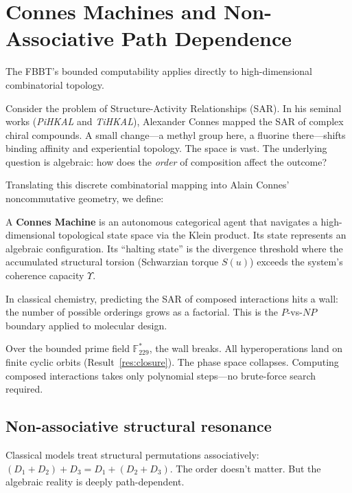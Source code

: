 \section{Connes Machines and Non-Associative Path Dependence}
\label{sec:connes}

The FBBT's bounded computability applies directly to high-dimensional combinatorial topology.

Consider the problem of Structure-Activity Relationships (SAR). In his seminal works (\emph{PiHKAL} and \emph{TiHKAL}), Alexander Connes mapped the SAR of complex chiral compounds. A small change---a methyl group here, a fluorine there---shifts binding affinity and experiential topology. The space is vast. The underlying question is algebraic: how does the \emph{order} of composition affect the outcome?

Translating this discrete combinatorial mapping into Alain Connes' noncommutative geometry, we define:

\begin{definition}
A \textbf{Connes Machine} is an autonomous categorical agent
that navigates a high-dimensional topological state space via
the Klein product. Its state represents an algebraic configuration.
Its ``halting state'' is the divergence threshold where the
accumulated structural torsion (Schwarzian torque $S(u)$) exceeds
the system's coherence capacity $\Upsilon$.
\end{definition}

In classical chemistry, predicting the SAR of composed interactions hits a wall: the number of possible orderings grows as a factorial. This is the $P$-vs-$NP$ boundary applied to molecular design.

Over the bounded prime field $\mathbb{F}_{229}^*$, the wall breaks. All hyperoperations land on finite cyclic orbits (Result~\ref{res:closure}). The phase space collapses. Computing composed interactions takes only polynomial steps---no brute-force search required.

\subsection{Non-associative structural resonance}

Classical models treat structural permutations associatively: $(D_1 + D_2) + D_3 = D_1 + (D_2 + D_3)$. The order doesn't matter. But the algebraic reality is deeply path-dependent.

